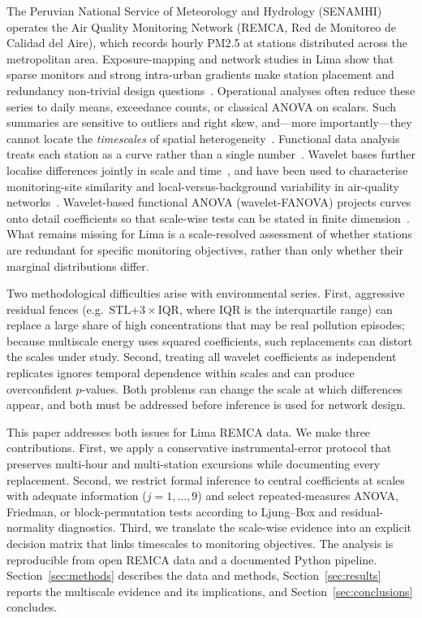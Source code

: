 \documentclass[12pt,letterpaper]{article}
\begin{document}
The Peruvian National Service of Meteorology and Hydrology (SENAMHI) operates the Air Quality Monitoring Network (REMCA, Red de Monitoreo de Calidad del Aire), which records hourly PM2.5 at stations distributed across the metropolitan area. Exposure-mapping and network studies in Lima show that sparse monitors and strong intra-urban gradients make station placement and redundancy non-trivial design questions~\cite{vu2019,romerobaylon2024}. Operational analyses often reduce these series to daily means, exceedance counts, or classical ANOVA on scalars. Such summaries are sensitive to outliers and right skew, and---more importantly---they cannot locate the \emph{timescales} of spatial heterogeneity~\cite{morettin2017,ignaccolo2008}. Functional data analysis treats each station as a curve rather than a single number~\cite{cardot1999,hall2007}. Wavelet bases further localise differences jointly in scale and time~\cite{abramovich2000,antoniadis2007}, and have been used to characterise monitoring-site similarity and local-versus-background variability in air-quality networks~\cite{gouveia2015,zimmerman2020}. Wavelet-based functional ANOVA (wavelet-FANOVA) projects curves onto detail coefficients so that scale-wise tests can be stated in finite dimension~\cite{abramovich2006,ma2018}. What remains missing for Lima is a scale-resolved assessment of whether stations are redundant for specific monitoring objectives, rather than only whether their marginal distributions differ.

Two methodological difficulties arise with environmental series. First, aggressive residual fences (e.g.\ STL+$3\times$IQR, where IQR is the interquartile range) can replace a large share of high concentrations that may be real pollution episodes; because multiscale energy uses squared coefficients, such replacements can distort the scales under study. Second, treating all wavelet coefficients as independent replicates ignores temporal dependence within scales and can produce overconfident $p$-values. Both problems can change the scale at which differences appear, and both must be addressed before inference is used for network design.

This paper addresses both issues for Lima REMCA data. We make three contributions. First, we apply a conservative instrumental-error protocol that preserves multi-hour and multi-station excursions while documenting every replacement. Second, we restrict formal inference to central coefficients at scales with adequate information ($j=1,\ldots,9$) and select repeated-measures ANOVA, Friedman, or block-permutation tests according to Ljung--Box and residual-normality diagnostics. Third, we translate the scale-wise evidence into an explicit decision matrix that links timescales to monitoring objectives. The analysis is reproducible from open REMCA data and a documented Python pipeline. Section~\ref{sec:methods} describes the data and methods, Section~\ref{sec:results} reports the multiscale evidence and its implications, and Section~\ref{sec:conclusions} concludes.
\end{document}
